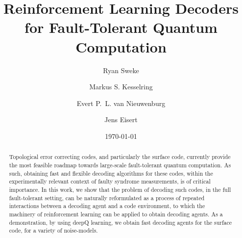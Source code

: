 \documentclass[twocolumn,preprintnumbers,amsmath,amssymb,notitlepage,nofootinbib,longbibliography,superscriptaddress,aps,pra,10pt]{revtex4-1}
\begin{document}
	\title{Reinforcement Learning Decoders for Fault-Tolerant Quantum Computation}

	\author{Ryan Sweke}
	\author{Markus S. Kesselring}
	\author{Evert P.~L. van Nieuwenburg}
	\author{Jens Eisert}

	\date{\today}

	\begin{abstract}
		Topological error correcting codes, and particularly the surface code, currently provide the most feasible 
		roadmap towards large-scale fault-tolerant quantum computation.
		As such, obtaining fast and flexible decoding algorithms for these codes, within the experimentally relevant context of faulty syndrome measurements, is of critical importance.
		In this work, we show that the problem of decoding such codes, in the full fault-tolerant setting, can be naturally reformulated as a process of repeated interactions between a decoding agent and a code environment, to which the machinery of reinforcement learning can be applied to obtain decoding agents.
		As a demonstration, by using deepQ learning, we obtain fast decoding agents for the surface code, for a variety of noise-models.
	\end{abstract}

\maketitle
\end{document}
